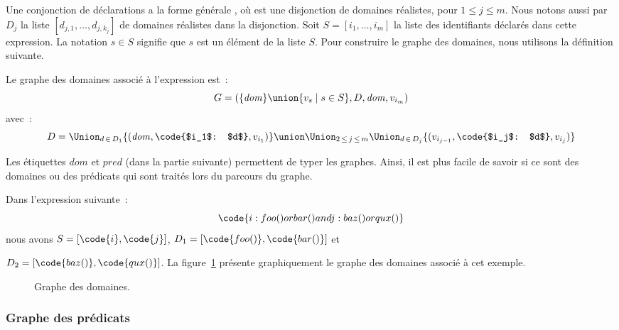 Une conjonction de déclarations a la forme générale , où 
est une disjonction de domaines réalistes, pour $1 \leq j \leq m$. Nous notons
aussi par $D_j$ la liste $[d_{j,1}, \dots, d_{j,k_j}]$ de domaines réalistes
dans la disjonction. Soit $S = [i_1, \dots, i_m]$ la liste des identifiants
déclarés dans cette expression. La notation $s \in S$ signifie que $s$ est un
élément de la liste $S$. Pour construire le graphe des domaines, nous utilisons
la définition suivante.

\begin{definition}

Le {\strong graphe des domaines} associé à l'expression  est~:
%
$$G = (\{\mathit{dom}\} \union \{v_s \;\vert\; s \in S\}, D, \mathit{dom}, v_{i_m})$$
%
avec~:
%
$$D = \Union_{d \,\in\, D_1} \{(\mathit{dom}, \code{$i_1$: $d$}, v_{i_1})\} \union
      \Union_{2 \,\leq\, j \,\leq\, m}
      \Union_{d \,\in\, D_j} \{(v_{i_{j - 1}}, \code{$i_j$: $d$}, v_{i_{j}})\}$$

\end{definition}

Les étiquettes $\mathit{dom}$ et $\mathit{pred}$ (dans la partie suivante)
permettent de typer les graphes. Ainsi, il est plus facile de savoir si ce sont
des domaines ou des prédicats qui sont traités lors du parcours du graphe.

\begin{example}
\label{example:test:expression_graph1}

Dans l'expression suivante~:
%
$$\code{i: foo() or bar() and j: baz() or qux()}$$
%
nous avons $S = [\code{i}, \code{j}]$, $D_1 = [\code{foo()}, \code{bar()}]$ et

$D_2 = [\code{baz()}, \code{qux()}]$. La figure~\ref{figure:test:domain_graph}
présente graphiquement le graphe des domaines associé à cet exemple.

\end{example}

\begin{figure}


\caption{\label{figure:test:domain_graph} Graphe des domaines.}

\end{figure}

\subsubsection{Graphe des prédicats}

